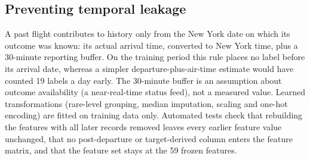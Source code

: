 \subsection{Preventing temporal leakage}
A past flight contributes to history only from the New York date on which its outcome was known:
its actual arrival time, converted to New York time, plus a 30-minute reporting buffer. On the
training period this rule places no label before its arrival date, whereas a simpler
departure-plus-air-time estimate would have counted 19 labels a day early. The 30-minute buffer is
an assumption about outcome availability (a near-real-time status feed), not a measured value.
Learned transformations (rare-level grouping, median imputation, scaling and one-hot encoding)
are fitted on training data only. Automated tests check that rebuilding the features with all
later records removed leaves every earlier feature value unchanged, that no post-departure or
target-derived column enters the feature matrix, and that the feature set stays at the 59 frozen
features.

